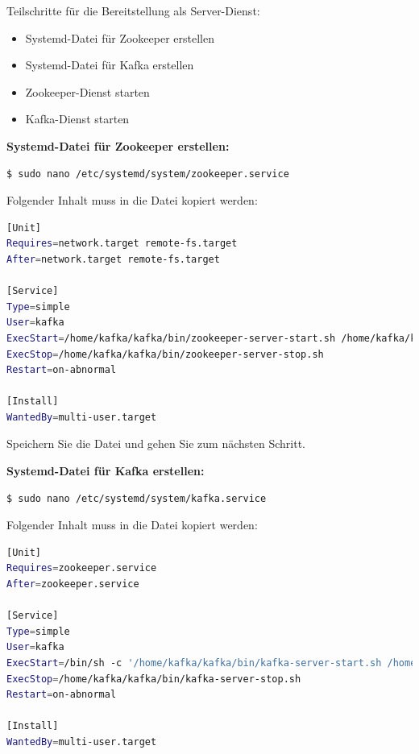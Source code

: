 \documentclass[a4paper,titlepage,halfparskip,12pt]{scrreprt}
\begin{document}
Teilschritte für die Bereitstellung als Server-Dienst:

\begin{itemize}
\item Systemd-Datei für Zookeeper erstellen
\item Systemd-Datei für Kafka erstellen
\item Zookeeper-Dienst starten
\item Kafka-Dienst starten
\end{itemize}

\bigskip

\textbf{Systemd-Datei für Zookeeper erstellen:}

\bigskip

\begin{lstlisting}[language=Bash]
$ sudo nano /etc/systemd/system/zookeeper.service
\end{lstlisting}

Folgender Inhalt muss in die Datei kopiert werden:

\smallskip

\begin{lstlisting}[language=Bash]
[Unit]
Requires=network.target remote-fs.target
After=network.target remote-fs.target

[Service]
Type=simple
User=kafka
ExecStart=/home/kafka/kafka/bin/zookeeper-server-start.sh /home/kafka/kafka/config/zookeeper.properties
ExecStop=/home/kafka/kafka/bin/zookeeper-server-stop.sh
Restart=on-abnormal

[Install]
WantedBy=multi-user.target
\end{lstlisting}

Speichern Sie die Datei und gehen Sie zum nächsten Schritt.

\pagebreak

\textbf{Systemd-Datei für Kafka erstellen:}

\bigskip

\begin{lstlisting}[language=Bash]
$ sudo nano /etc/systemd/system/kafka.service
\end{lstlisting}

Folgender Inhalt muss in die Datei kopiert werden:

\smallskip

\begin{lstlisting}[language=Bash]
[Unit]
Requires=zookeeper.service
After=zookeeper.service

[Service]
Type=simple
User=kafka
ExecStart=/bin/sh -c '/home/kafka/kafka/bin/kafka-server-start.sh /home/kafka/kafka/config/server.properties > /home/kafka/kafka/kafka.log 2>&1'
ExecStop=/home/kafka/kafka/bin/kafka-server-stop.sh
Restart=on-abnormal

[Install]
WantedBy=multi-user.target
\end{lstlisting}
\end{document}
